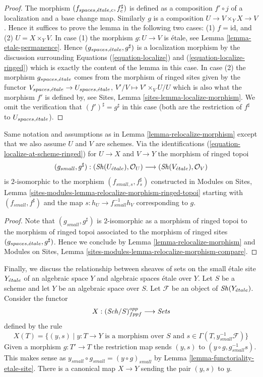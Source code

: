 \begin{proof}
The morphism $(f_{spaces, {\acute{e}tale}, c}, f_c^\sharp)$ is defined as a
composition $f' \circ j$
of a localization and a base change map. Similarly $g$ is a composition
$U \to V \times_Y X \to V$. Hence it suffices to prove
the lemma in the following two cases: (1) $f = \text{id}$, and
(2) $U = X \times_Y V$. In case (1) the morphism $g : U \to V$ is
\'etale, see
Lemma \ref{lemma-etale-permanence}.
Hence $(g_{spaces, {\acute{e}tale}}, g^\sharp)$ is a localization morphism
by the discussion surrounding
Equations (\ref{equation-localize}) and
(\ref{equation-localize-ringed})
which is exactly the content of the lemma in this case.
In case (2) the morphism $g_{spaces, {\acute{e}tale}}$
comes from the morphism of ringed sites given by the functor
$V_{spaces, {\acute{e}tale}} \to U_{spaces, {\acute{e}tale}}$,
$V'/V \mapsto V' \times_V U/U$
which is also what the morphism $f'$ is defined by, see
Sites, Lemma \ref{sites-lemma-localize-morphism}.
We omit the verification that $(f')^\sharp = g^\sharp$
in this case (both are the restriction of $f^\sharp$
to $U_{spaces, {\acute{e}tale}}$).
\end{proof}

\begin{lemma}
\label{lemma-relocalize-morphism-at-schemes}
Same notation and assumptions as in
Lemma \ref{lemma-relocalize-morphism}
except that we also assume $U$ and $V$ are schemes.
Via the identifications
(\ref{equation-localize-at-scheme-ringed})
for $U \to X$ and $V \to Y$ the morphism of ringed topoi
$$
(g_{small}, g^\sharp) :
(\mathop{\mathit{Sh}}\nolimits(U_{\acute{e}tale}), \mathcal{O}_U)
\longrightarrow
(\mathop{\mathit{Sh}}\nolimits(V_{\acute{e}tale}), \mathcal{O}_V)
$$
is $2$-isomorphic to the morphism $(f_{small, s}, f_s^\sharp)$
constructed in
Modules on Sites,
Lemma \ref{sites-modules-lemma-relocalize-morphism-ringed-topoi}
starting with $(f_{small}, f^\sharp)$ and
the map $s : h_U \to f_{small}^{-1}h_V$ corresponding to $g$.
\end{lemma}

\begin{proof}
Note that $(g_{small}, g^\sharp)$ is $2$-isomorphic as a
morphism of ringed topoi to the morphism of ringed topoi
associated to the morphism of ringed sites
$(g_{spaces, {\acute{e}tale}}, g^\sharp)$. Hence we conclude by
Lemma \ref{lemma-relocalize-morphism}
and
Modules on Sites,
Lemma \ref{sites-modules-lemma-relocalize-morphism-compare}.
\end{proof}

\noindent
Finally, we discuss the relationship between sheaves of sets on the small
\'etale site $Y_{\acute{e}tale}$ of an algebraic space $Y$ and algebraic spaces
\'etale over $Y$. Let $S$ be a scheme and let $Y$ be an algebraic space
over $S$. Let $\mathcal{F}$ be an object of $\mathop{\mathit{Sh}}\nolimits(Y_{\acute{e}tale})$. Consider
the functor
$$
X : (\mathit{Sch}/S)_{fppf}^{opp} \longrightarrow \textit{Sets}
$$
defined by the rule
$$
X(T) = \{(y, s) \mid y : T \to Y\text{ is a morphism over }S\text{ and }
s \in \Gamma(T, y_{small}^{-1}\mathcal{F})\}
$$
Given a morphism $g : T' \to T$ the restriction map sends
$(y, s)$ to $(y \circ g, g_{small}^{-1}s)$. This makes sense
as $y_{small} \circ g_{small} = (y \circ g)_{small}$ by
Lemma \ref{lemma-functoriality-etale-site}. There is a canonical map
$X \to Y$ sending the pair $(y, s)$ to $y$.

